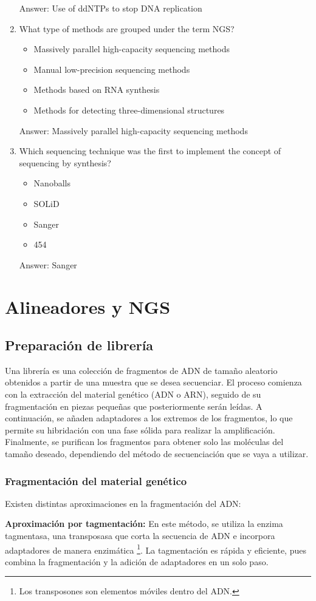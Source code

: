 \begin{enumerate}
Answer: Use of ddNTPs to stop DNA replication

\item What type of methods are grouped under the term NGS?
\begin{itemize}
\item Massively parallel high-capacity sequencing methods
\item Manual low-precision sequencing methods
\item Methods based on RNA synthesis
\item Methods for detecting three-dimensional structures
\end{itemize}

Answer: Massively parallel high-capacity sequencing methods

\item Which sequencing technique was the first to implement the concept of sequencing by synthesis?
\begin{itemize}
\item Nanoballs
\item SOLiD
\item Sanger
\item 454
\end{itemize}

Answer: Sanger
\end{enumerate}

\chapter{Alineadores y NGS}
\section{Preparación de librería}
Una librería es una colección de fragmentos de ADN de tamaño aleatorio obtenidos a partir de una muestra que se desea secuenciar. El proceso comienza con la extracción del material genético (ADN o ARN), seguido de su fragmentación en piezas pequeñas que posteriormente serán leídas. A continuación, se añaden adaptadores a los extremos de los fragmentos, lo que permite su hibridación con una fase sólida para realizar la amplificación. Finalmente, se purifican los fragmentos para obtener solo las moléculas del tamaño deseado, dependiendo del método de secuenciación que se vaya a utilizar.

\subsection{Fragmentación del material genético}
Existen distintas aproximaciones en la fragmentación del ADN:
\item \textbf{Aproximación por tagmentación: }
En este método, se utiliza la enzima tagmentasa, una transposasa que corta la secuencia de ADN e incorpora adaptadores de manera enzimática \footnote{Los transposones son elementos móviles dentro del ADN.}. La tagmentación es rápida y eficiente, pues combina la fragmentación y la adición de adaptadores en un solo paso.

